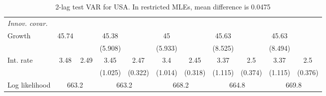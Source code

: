\begin{table}[htbp]
\begin{tabular}{@{\extracolsep{4pt}}lcccccccccc@{}}
\rule{0pt}{4ex} \emph{Innov. covar.}  	 & 	 & 	 & 	 & 	 & 	 & 	 & 	 & 	 & 	 &\\ 
\quad Growth 	 &45.74 	 &  	 & 45.38 	 &  	 & 45 	 &  	 & 45.63 	 &  	 & 45.63 	 & 	 \\ 
 		 &  	 &  	 & (5.908) 	 &  	 & (5.933) 	 &  	 & (8.525) 	 &  	 & (8.494) 	 &  	 \\ 
\quad Int. rate 	 &3.48 	 & 2.49 	 & 3.45 	 & 2.47 	 & 3.4 	 & 2.45 	 & 3.37 	 & 2.5 	 & 3.37 	 & 2.5	 \\ 
 		 &  	 &  	 & (1.025) 	 & (0.322) 	 & (1.014) 	 & (0.318) 	 & (1.115) 	 & (0.374) 	 & (1.115) 	 & (0.376) 	 \\ 
 \hline \rule{0pt}{4ex} 
  Log likelihood 	 &\multicolumn{2}{c}{663.2} 	 & \multicolumn{2}{c}{663.2} 	 & \multicolumn{2}{c}{668.2} 	 & \multicolumn{2}{c}{664.8} 	 & \multicolumn{2}{c}{669.8}\\ 

 \hline 	\end{tabular}		\caption{2-lag test VAR for USA. In restricted MLEs, mean difference is 0.0475}
		\label{tab:USA2lag}

\end{table}